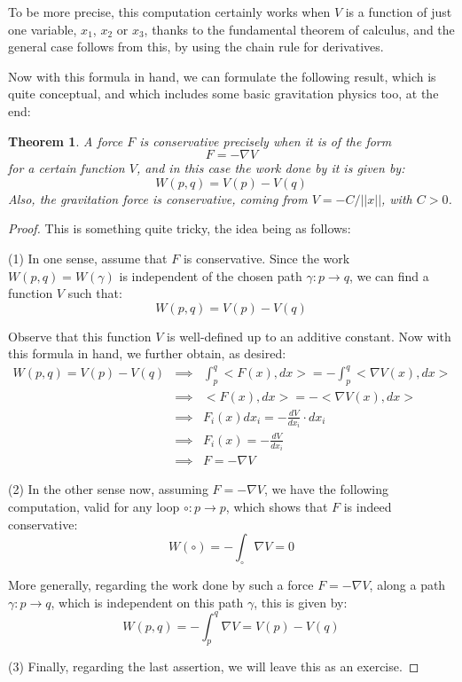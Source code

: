 \documentclass[12pt]{amsbook}
\newtheorem{theorem}{Theorem}[chapter]
\begin{document}
To be more precise, this computation certainly works when $V$ is a function of just one variable, $x_1$, $x_2$ or $x_3$, thanks to the fundamental theorem of calculus, and the general case follows from this, by using the chain rule for derivatives.

\bigskip

Now with this formula in hand, we can formulate the following result, which is quite conceptual, and which includes some basic gravitation physics too, at the end:

\begin{theorem}
A force $F$ is conservative precisely when it is of the form
$$F=-\nabla V$$
for a certain function $V$, and in this case the work done by it is given by:
$$W(p,q)=V(p)-V(q)$$
Also, the gravitation force is conservative, coming from $V=-C/||x||$, with $C>0$.
\end{theorem}

\begin{proof}
This is something quite tricky, the idea being as follows:

\medskip

(1) In one sense, assume that $F$ is conservative. Since the work $W(p,q)=W(\gamma)$ is independent of the chosen path $\gamma:p\to q$, we can find a function $V$ such that:
$$W(p,q)=V(p)-V(q)$$

Observe that this function $V$ is well-defined up to an additive constant. Now with this formula in hand, we further obtain, as desired:
\begin{eqnarray*}
W(p,q)=V(p)-V(q)
&\implies&\int_p^q<F(x),dx>=-\int_p^q<\nabla V(x),dx>\\
&\implies&<F(x),dx>=-<\nabla V(x),dx>\\
&\implies&F_i(x)dx_i=-\frac{dV}{dx_i}\cdot dx_i\\
&\implies&F_i(x)=-\frac{dV}{dx_i}\\
&\implies&F=-\nabla V
\end{eqnarray*}

(2) In the other sense now, assuming $F=-\nabla V$, we have the following computation, valid for any loop $\circ:p\to p$, which shows that $F$ is indeed conservative:
$$W(\circ)
=-\int_\circ\nabla V
=0$$

More generally, regarding the work done by such a force $F=-\nabla V$, along a path $\gamma:p\to q$, which is independent on this path $\gamma$, this is given by:
$$W(p,q)
=-\int_p^q\nabla V
=V(p)-V(q)$$

(3) Finally, regarding the last assertion, we will leave this as an exercise.
\end{proof}
\end{document}
